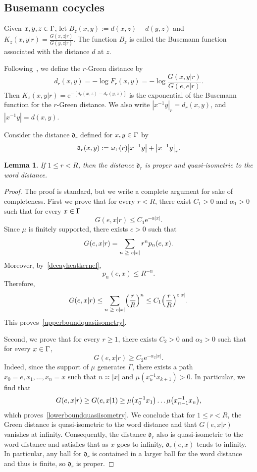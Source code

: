 \documentclass[10pt]{amsart}
\newtheorem{lemm}[theo]{Lemma}\newtheorem{prop}[theo]{Proposition}\newtheorem{coro}[theo]{Corollary}\newtheorem{conj}[theo]{Conjecture}
\theoremstyle{definition}\newtheorem{defi}[theo]{Definition}\newtheorem{rema}[theo]{Remark}\newtheorem{exam}[theo]{Example}\newtheorem{exem}[theo]{Example}\newtheorem{nota}[theo]{Notation}
\newcommand{\rme}{\mathrm{e}}
\newcommand{\fkd}{\mathfrak{d}}
\let\originalleft\left
\let\originalright\right
\renewcommand{\left}{\mathopen{}\mathclose\bgroup\originalleft}
\renewcommand{\right}{\aftergroup\egroup\originalright}
\let\oldin\in
\renewcommand{\in}{\mathchoice{\oldin}{\oldin}{\,\oldin\,}{\,\oldin\,}}
\let\oldge\ge
\renewcommand{\ge}{\mathchoice{\oldge}{\oldge}{\,\oldge\,}{\,\oldge\,}}
\begin{document}
\subsection{Busemann cocycles}
Given $x,y,z \in \Gamma$, let $B_z(x, y) := d(x, z) -d(y,z)$ and $K_z(x,y|r)=\frac{G(x,z|r)}{G(y,z|r)}$. The function $B_z$ is called the Busemann function associated with the distance $d$ at $z$.

Following~\cite{BlachereBrofferio}, we define the $r$-Green distance by
\[
d_r(x,y) = - \log F_r(x,y)=-\log \frac{ G(x,y|r)}{G(e,e|r)}.
\]
Then $K_z(x,y|r)=\rme^{-[d_r(x,z)-d_r(y,z)]}$ is the exponential of the Busemann function for the $r$-Green distance. We also write $|x^{-1}y|_r=d_r(x,y)$, and $|x^{-1}y|=d(x,y)$.

Consider the distance $\fkd_r$ defined for $x,y\in \Gamma$ by
\[
\fkd_r(x,y):=\omega_\Gamma(r)\left|x^{-1}y\right| +\left|x^{-1}y\right|_r.
\]

\begin{lemm}\label{quasiisometricdistances}
If $1\leq r<R$, then the distance $\fkd_r$ is proper and quasi-isometric to the word distance.
\end{lemm}

\begin{proof}
The proof is standard, but we write a complete argument for sake of completeness. First we prove that for every $r<R$, there exist $C_1> 0$ and $\alpha_1>0$ such that for every $x\in \Gamma$
\begin{equation}\label{upperboundquasiisometry}
G(e,x|r)\leq C_1\rme^{-\alpha |x|}.
\end{equation}
Since $\mu$ is finitely supported, there exists $c> 0$ such that
\[
G(e,x|r)=\sum_{n\ge c|x|}r^np_n(e,x).
\]
Moreover, by~\eqref{decayheatkernel},
\[
p_n(e,x)\leq R^{-n}.
\]
Therefore,
\[
G(e,x|r)\leq \sum_{n\ge c|x|}\left (\frac{r}{R}\right)^n\leq C_1\left (\frac{r}{R}\right)^{c|x|}.
\]
This proves~\eqref{upperboundquasiisometry}.

Second, we prove that for every $r\geq 1$, there exists $C_2>0$ and $\alpha_2>0$ such that for every $x\in \Gamma$,
\begin{equation}\label{lowerboundquasiisometry}
G(e,x|r)\geq C_2 \rme^{-\alpha_2 |x|}.
\end{equation}
Indeed, since the support of $\mu$ generates $\Gamma$, there exists a path $x_0=e,x_1,\dots,x_n=x$ such that $n\asymp |x|$ and $\mu(x_k^{-1}x_{k+1})>0$. In particular, we find that
\[
G(e,x|r)\geq G(e,x|1)\geq \mu\left(x_0^{-1}x_1\right)\dots \mu\left(x_{n-1}^{-1}x_n\right),
\]
which proves~\eqref{lowerboundquasiisometry}. We conclude that for $1\leq r<R$, the Green distance is quasi-isometric to the word distance and that $G(e,x|r)$ vanishes at infinity. Consequently, the distance $\fkd_r$ also is quasi-isometric to the word distance and satisfies that as $x$ goes to infinity, $\fkd_r(e,x)$ tends to infinity. In particular, any ball for $\fkd_r$ is contained in a larger ball for the word distance and thus is finite, so $\fkd_r$ is proper.
\end{proof}
\end{document}

